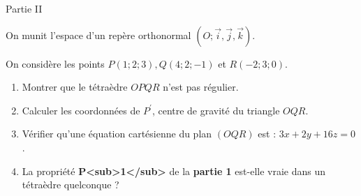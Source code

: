 \begin{h3}Partie II\end{h3}
On munit l'espace d'un repère orthonormal $\left(O ; \vec{i},\vec{j},\vec{k}\right)$.
\par
On considère les points $P\left(1 ; 2 ; 3\right), Q\left(4 ;  2 ; -1\right)$ et $R\left(-2 ; 3 ; 0\right)$.
\begin{enumerate}
     \item
     Montrer que le tétraèdre $OPQR$ n'est pas régulier.
     \item
     Calculer les coordonnées de $P^{\prime}$, centre de gravité du triangle $OQR$.
     \item
     Vérifier qu'une équation cartésienne du plan $\left(OQR\right)$ est : $3x+2y+16z=0$.
     \item
     La propriété \textbf{P<sub>1</sub>} de la \textbf{partie 1} est-elle vraie dans un tétraèdre quelconque ?
\end{enumerate}
